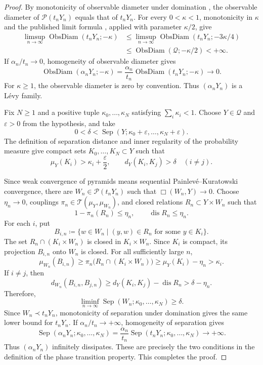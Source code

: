 \documentclass{amsart}
\numberwithin{equation}{section}
\theoremstyle{plain}
\theoremstyle{definition}
\theoremstyle{remark}
\newcommand{\Pyr}{\mathcal{P}}
\newcommand{\eps}{\varepsilon}
\DeclareMathOperator{\Sep}{Sep}
\DeclareMathOperator{\ObsDiam}{ObsDiam}
\begin{document}
\begin{proof}
	By monotonicity of observable diameter under domination
	\cite[Proposition~2.18(3)]{shioya2016mmg}, the observable
	diameter of $\Pyr(t_nY_n)$ equals that of $t_nY_n$.  For every $0<\kappa<1$,
	monotonicity in $\kappa$ and the published limit formula
	\cite[Theorem~1.1]{yokota2024obsdiam}, applied with parameter $\kappa/2$,
	give
	\[
	\begin{aligned}
\limsup_{n\to\infty}\ObsDiam(t_nY_n;-\kappa) &\le\limsup_{n\to\infty}\ObsDiam(t_nY_n;-3\kappa/4)\\
		&\le\ObsDiam(\mathcal Q;-\kappa/2)<+\infty.
	\end{aligned}
	\]
	If $\alpha_n/t_n\to0$, homogeneity of observable diameter
	\cite[Proposition~2.19]{shioya2016mmg} gives
\[ \ObsDiam(\alpha_nY_n;-\kappa) =\frac{\alpha_n}{t_n}\ObsDiam(t_nY_n;-\kappa)\longrightarrow0. \]
	For $\kappa\ge1$, the observable diameter is zero by convention.  Thus
	$(\alpha_nY_n)$ is a L\'evy family.

	Fix $N\ge1$ and a positive tuple $\kappa_0,\ldots,\kappa_N$ satisfying
	$\sum_i\kappa_i<1$.  Choose $Y\in\mathcal Q$ and $\eps>0$ from the
	hypothesis, and take
	\[
		0<\delta<\Sep(Y;\kappa_0+\eps,\ldots,\kappa_N+\eps).
	\]
	The definition of separation distance and inner regularity of the
	probability measure give compact sets $K_0,\ldots,K_N\subset Y$ such that
\[ \mu_Y(K_i)>\kappa_i+\frac{\eps}{2}, \qquad d_Y(K_i,K_j)>\delta\quad(i\ne j). \]

	Since weak convergence of pyramids means sequential
	Painlev\'e--Kuratowski convergence, there are $W_n\in\Pyr(t_nY_n)$ such that
	$\Box(W_n,Y)\to0$.  Choose $\eta_n\to0$, couplings
	$\pi_n\in\mathcal T(\mu_Y,\mu_{W_n})$, and closed relations
	$R_n\subset Y\times W_n$ such that
	\[
		1-\pi_n(R_n)\le\eta_n,\qquad\operatorname{dis}R_n\le\eta_n.
	\]
	For each $i$, put
\[ B_{i,n}\coloneqq \{w\in W_n\mid (y,w)\in R_n\text{ for some }y\in K_i\}. \]
	The set $R_n\cap(K_i\times W_n)$ is closed in $K_i\times W_n$.  Since
	$K_i$ is compact, its projection $B_{i,n}$ onto $W_n$ is closed.  For
	all sufficiently large $n$,
\[ \mu_{W_n}(B_{i,n}) \ge\pi_n\bigl(R_n\cap(K_i\times W_n)\bigr) \ge\mu_Y(K_i)-\eta_n>\kappa_i. \]
	If $i\ne j$, then
\[ d_{W_n}(B_{i,n},B_{j,n}) \ge d_Y(K_i,K_j)-\operatorname{dis}R_n>\delta-\eta_n. \]
	Therefore,
	\[
		\liminf_{n\to\infty}\Sep(W_n;\kappa_0,\ldots,\kappa_N)\ge\delta.
	\]
	Since $W_n\prec t_nY_n$, monotonicity of separation under domination
	\cite[Lemma~2.25]{shioya2016mmg} gives the same lower bound for $t_nY_n$.
	If $\alpha_n/t_n\to+\infty$, homogeneity of separation
	\cite[Proposition~2.9]{ozawa2015limit} gives
	\[
		\Sep(\alpha_nY_n;\kappa_0,\ldots,\kappa_N)
		=\frac{\alpha_n}{t_n}\Sep(t_nY_n;\kappa_0,\ldots,\kappa_N)
		\longrightarrow+\infty.
	\]
	Thus $(\alpha_nY_n)$ infinitely dissipates.  These are precisely the two
	conditions in the definition of the phase transition property.  This
	completes the proof.
\end{proof}
\end{document}
